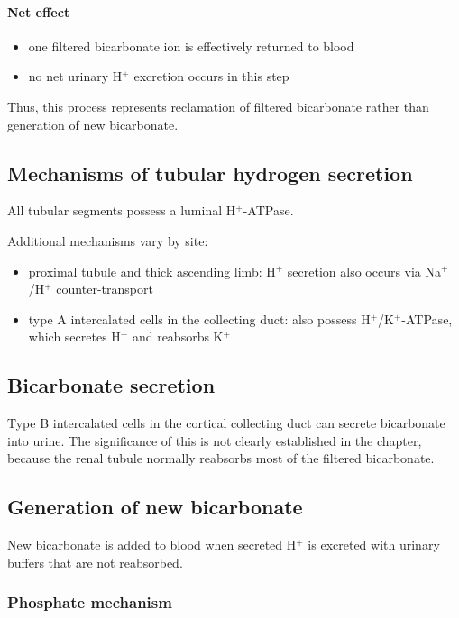 \documentclass[11pt,a4paper]{article}
\begin{document}
\paragraph{Net effect}
\begin{itemize}
    \item one filtered bicarbonate ion is effectively returned to blood
    \item no net urinary H$^+$ excretion occurs in this step
\end{itemize}

Thus, this process represents reclamation of filtered bicarbonate rather than generation of new bicarbonate.

\subsection{Mechanisms of tubular hydrogen secretion}

All tubular segments possess a luminal H$^+$-ATPase.

Additional mechanisms vary by site:
\begin{itemize}
    \item proximal tubule and thick ascending limb: H$^+$ secretion also occurs via Na$^+$/H$^+$ counter-transport
    \item type A intercalated cells in the collecting duct: also possess H$^+$/K$^+$-ATPase, which secretes H$^+$ and reabsorbs K$^+$
\end{itemize}

\subsection{Bicarbonate secretion}

Type B intercalated cells in the cortical collecting duct can secrete bicarbonate into urine. The significance of this is not clearly established in the chapter, because the renal tubule normally reabsorbs most of the filtered bicarbonate.

\subsection{Generation of new bicarbonate}

New bicarbonate is added to blood when secreted H$^+$ is excreted with urinary buffers that are not reabsorbed.

\subsubsection{Phosphate mechanism}
\end{document}

